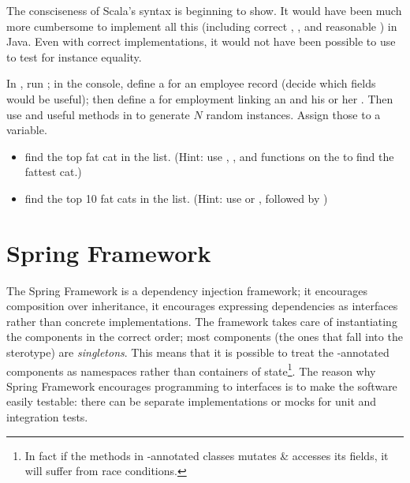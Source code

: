\documentclass[10 pt]{article}
\begin{document}
The consciseness of Scala's syntax is beginning to show. It would have been much more cumbersome to implement all this (including correct , , and reasonable ) in Java. Even with correct implementations, it would not have been possible to use \pcode{==} to test for instance equality. 

\begin{example}
In , run ; in the console, define a  for an employee record (decide which fields would be useful); then define a  for employment linking an  and his or her . Then use  and useful methods in  to generate $N$ random  instances. Assign those to a variable.

\begin{itemize}
  \item find the top fat cat in the list. (Hint: use , , and  functions on the  to find the fattest cat.)
  \item find the top 10 fat cats in the list. (Hint: use  or , followed by )
\end{itemize}
\end{example}

\section{Spring Framework}
The Spring Framework is a dependency injection framework; it encourages composition over inheritance, it encourages expressing dependencies as interfaces rather than concrete implementations. The framework takes care of instantiating the components in the correct order; most components (the ones that fall into the  sterotype) are \emph{singletons}. This means that it is possible to treat the -annotated components as namespaces rather than containers of state\footnote{In fact if the methods in -annotated classes mutates \& accesses its fields, it will suffer from race conditions.}. The reason why Spring Framework encourages programming to interfaces is to make the software easily testable: there can be separate implementations or mocks for unit and integration tests.
\end{document}
